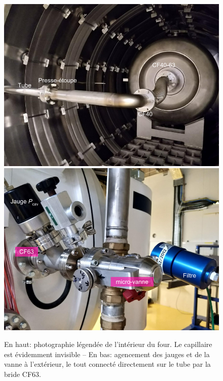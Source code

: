 \begin{figure}
    \centering
    \includegraphics[width=.75\textwidth]{Figures/montage_four.pdf}\\
    \includegraphics[width=.75\textwidth]{Figures/montage_vanne.pdf}%
    \caption[Photographies de l'intérieur du four et de la vanne.]{En haut: photographie légendée de l'intérieur du four. Le capillaire est évidemment invisible -- En bas: agencement des jauges et de la vanne à l'extérieur, le tout connecté directement sur le tube par la bride CF63.}
    \label{fig:photoIntFour}
    \label{fig:photoVanne}
\end{figure}

